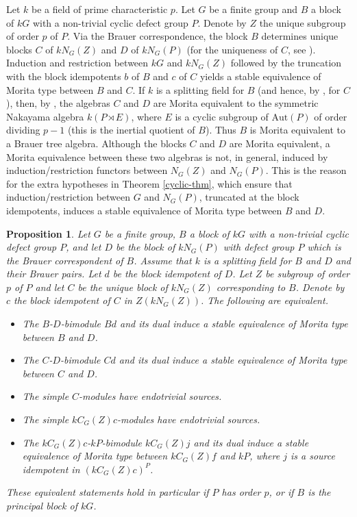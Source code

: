 \documentclass{amsart}
\theoremstyle{plain}\newtheorem{Theorem}{Theorem}[section]
\theoremstyle{plain}\newtheorem{Conjecture}[Theorem]{Conjecture}
\theoremstyle{plain}\newtheorem{Corollary}[Theorem]{Corollary}
\theoremstyle{plain}\newtheorem{Lemma}[Theorem]{Lemma}
\theoremstyle{plain}\newtheorem{Proposition}[Theorem]{Proposition}
\theoremstyle{definition}\newtheorem{Definition}[Theorem]{Definition}
\theoremstyle{definition}\newtheorem{Example}[Theorem]{Example}
\theoremstyle{definition}\newtheorem{Examples}[Theorem]{Examples}
\theoremstyle{definition}\newtheorem{Exercise}[Theorem]{Exercise}
\theoremstyle{definition}\newtheorem{Notation}[Theorem]{Notation}
\theoremstyle{definition}\newtheorem{Remark}[Theorem]{Remark}
\theoremstyle{definition}\newtheorem{Remarks}[Theorem]{Remarks}
\theoremstyle{plain}\newtheorem{Statement}[Theorem]{}
\def\Aut{\mathrm{Aut}}               \def\tenk{\otimes_k}
\begin{document}
 Let $k$ be a field of prime characteristic $p$.
 Let $G$ be a finite group and $B$ a block of $kG$ with a non-trivial cyclic defect
 group $P$. Denote by $Z$ the unique subgroup of order $p$ of $P$.
 Via the Brauer correspondence, the block $B$ determines unique
 blocks $C$ of $kN_G(Z)$ and $D$ of $kN_G(P)$ (for the uniqueness of $C$, see
 \cite[Theorem 9.8.6]{LiBookII}). Induction and restriction
 between $kG$ and $kN_G(Z)$ followed by the truncation with the block
 idempotents $b$ of $B$ and $c$ of $C$ yields a stable equivalence of Morita type
 between $B$ and $C$. If $k$ is a splitting field for $B$ (and hence, by
 \cite[Proposition 11.6.2]{LiBookII}, for $C$), then, by \cite[Theorem 11.2.2]{LiBookI}, 
 the algebras $C$ and $D$ are Morita equivalent to
 the symmetric Nakayama algebra $k(P\rtimes E)$, where $E$ is a cyclic
 subgroup of $\Aut(P)$ of order dividing $p-1$ (this is the inertial quotient of $B$).
 Thus $B$ is Morita equivalent to a Brauer tree algebra. Although the blocks
 $C$ and $D$ are Morita equivalent, a Morita equivalence between these two 
 algebras is not, in general, induced by induction/restriction functors between 
 $N_G(Z)$ and $N_G(P)$.
 This is the reason for the extra hypotheses in Theorem \ref{cyclic-thm}, which
 ensure that  induction/restriction between $G$ and $N_G(P)$, truncated at the 
 block idempotents,  
 induces a stable equivalence of Morita type between $B$ and $D$.
 
 \begin{Proposition} \label{splendid-stable-cyclic-Prop}
 Let $G$ be a finite group, $B$ a block of $kG$ with a non-trivial cyclic defect
 group $P$, and let $D$ be the block of $kN_G(P)$ with defect group $P$
 which is the Brauer correspondent of $B$. Assume that $k$ is a splitting field
 for $B$ and $D$ and their Brauer pairs. 
 Let $d$ be the block idempotent of $D$.   Let $Z$ be subgroup of order $p$
 of $P$ and let $C$ be the unique block of $kN_G(Z)$ corresponding to $B$.
 Denote by $c$ the block idempotent of $C$ in $Z(kN_G(Z))$.
 The following are equivalent.
 \begin{itemize}
 \item[{\rm (i)}] The $B$-$D$-bimodule $Bd$ and its dual induce a stable 
 equivalence of Morita type between $B$ and $D$.
 \item[{\rm (ii)}] The $C$-$D$-bimodule $Cd$ and its dual induce a stable 
 equivalence of Morita type between $C$ and $D$.
 \item[{\rm (iii)}] The simple $C$-modules have endotrivial sources.
 \item[{\rm (iv)}] The simple $kC_G(Z)c$-modules have endotrivial sources.
 \item[{\rm (v)}] The $kC_G(Z)c$-$kP$-bimodule $kC_G(Z)j$ and its dual induce
 a stable equivalence of Morita type between $kC_G(Z)f$ and $kP$, 
 where $j$ is a source idempotent in $(kC_G(Z)c)^P$.
 \end{itemize}
 These equivalent statements hold in particular if $P$ has order $p$,  or
 if $B$ is the principal block of $kG$.
 \end{Proposition}
 
\end{document}
